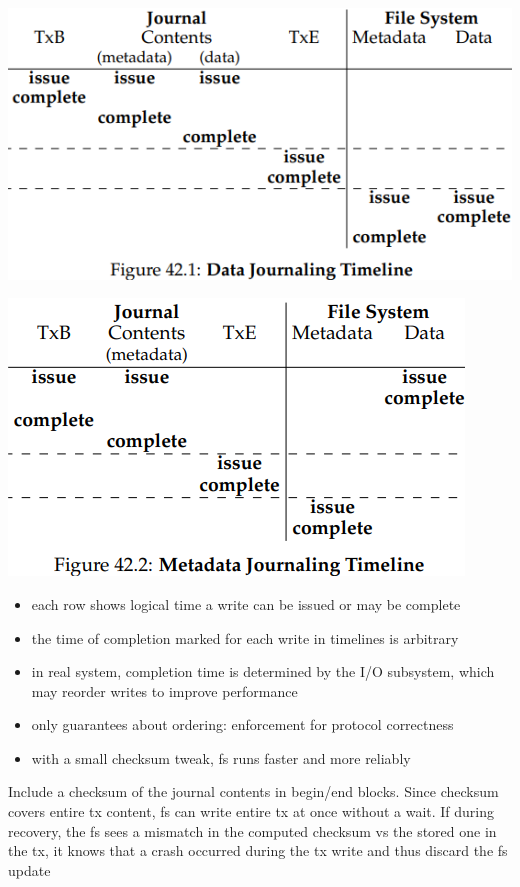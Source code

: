 \begin{minipage}{.55\linewidth}
  \includegraphics[width=\linewidth]{imgs/jn_tl1}
\end{minipage}
\begin{minipage}{.45\linewidth}
  \includegraphics[width=\linewidth]{imgs/jn_tl2}
\end{minipage}
\begin{itemize}
\item each row shows logical time a write can be issued or may be complete
\item the time of completion marked for each write in timelines is arbitrary
\item in real system, completion time is determined by the I/O subsystem, which may reorder writes to improve performance
\item only guarantees about ordering: enforcement for protocol correctness
\item with a small checksum tweak, fs runs faster and more reliably \faHandODown
\end{itemize}
\begin{tcolorbox}[left=0mm, top=1mm, right=0mm, rightlower=0mm, bottom=1mm,
  title= \faLinux ext4 trick to optimize log writes,
  halign title=center]
  Include a checksum of the journal contents in begin/end blocks. Since checksum covers entire tx content, fs can write entire tx at once without a wait. If during recovery, the fs sees a mismatch in the computed checksum vs the stored one in the tx, it knows that a crash occurred during the tx write and thus discard the fs update
\end{tcolorbox}
